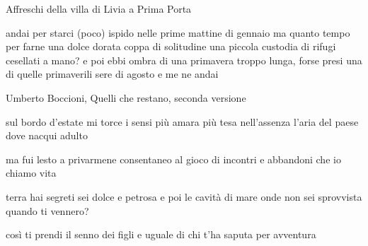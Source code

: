 \begin{volumetitlepage}
	\bigskip\bigskip\bigskip
\end{volumetitlepage}


\begin{artItem}
	Affreschi della villa di Livia a Prima Porta
\end{artItem}

\begin{poem}
	\begin{stanza}
		andai per starci (poco)\verseline
		ispido nelle prime mattine di gennaio\verseline
		ma quanto tempo per farne\verseline
		una dolce dorata coppa di solitudine\verseline
		una piccola custodia di rifugi cesellati a mano?\verseline
		e poi ebbi ombra\verseline
		di una primavera troppo lunga, forse\verseline
		presi una di quelle primaverili sere di agosto\verseline
		e me ne andai
	\end{stanza}
\end{poem}

\clearpage


\begin{artItem}
	Umberto Boccioni, Quelli che restano, seconda versione
\end{artItem}

\begin{poem}
	\begin{stanza}
		sul bordo d'estate mi torce i sensi\verseline
		più amara più tesa nell'assenza\verseline
		l'aria del paese dove nacqui adulto
	\end{stanza}

	\begin{stanza}
		ma fui lesto a privarmene\verseline
		consentaneo al gioco di incontri\verseline
		e abbandoni che io chiamo vita
	\end{stanza}
\end{poem}

\clearpage


\begin{poem}
	\begin{stanza}
		terra hai segreti\verseline
		sei dolce e petrosa\verseline
		e poi le cavità di mare\verseline
		onde non sei sprovvista\verseline
		quando ti vennero?
	\end{stanza}

	\begin{stanza}
		così ti prendi il senno\verseline
		dei figli e uguale di chi\verseline
		t’ha saputa per avventura
	\end{stanza}
\end{poem}


